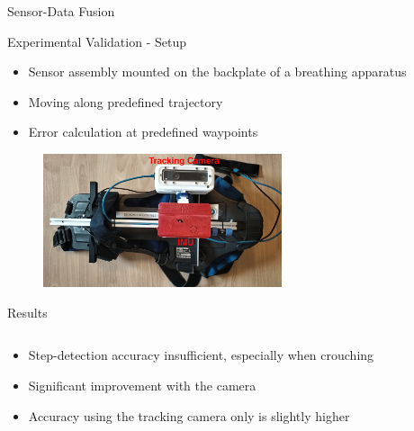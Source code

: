 \documentclass[aspectratio=169,handout]{beamer}
\begin{document}
{\begin{frame}{Sensor-Data Fusion}
	\end{frame}
	
	
	\begin{frame}{Experimental Validation - Setup}
		\begin{itemize}
			\item<2-> Sensor assembly mounted on the backplate of a breathing apparatus
			\item<3-> Moving along predefined trajectory
			\item<4-> Error calculation at predefined waypoints
		\end{itemize}
		\begin{figure}
			\centering
			\includegraphics[width=7cm]{../Conference_Paper/Assembly.jpg}
		\end{figure}
		
	\end{frame}
	
	
		\begin{frame}{Results}
		\begin{columns}
			\begin{column}{0.45\textwidth}
				\begin{itemize}
					\item<2-> Step-detection accuracy insufficient, especially when crouching
					\item<3-> Significant improvement with the camera
					\item<4-> Accuracy using the tracking camera  only is slightly higher %
				\end{itemize}
				\vspace{2.4cm}
				

\end{column}
\end{columns}
\end{frame}}
\end{document}
